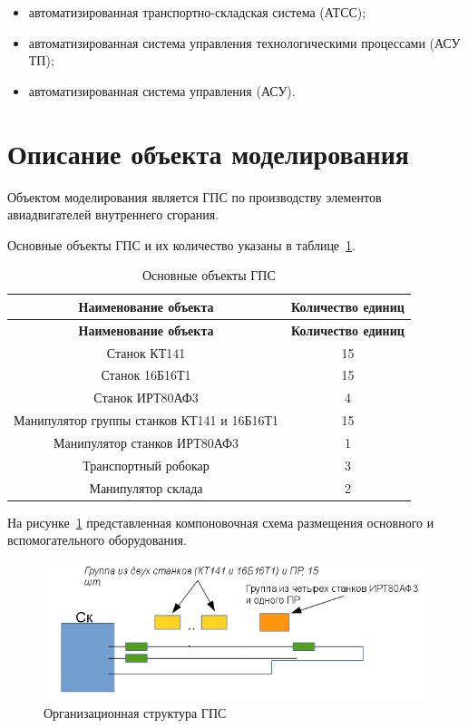 \begin{itemize}
    \item автоматизированная транспортно-складская система (АТСС);
    \item автоматизированная система управления технологическими процессами (АСУ ТП);
    \item автоматизированная система управления (АСУ).
\end{itemize}

\section{Описание объекта моделирования}

Объектом моделирования является ГПС по производству элементов авиадвигателей внутреннего сгорания. 

Основные объекты ГПС и их количество указаны в таблице~\ref{tab:objects}.

\begin{longtable}[c]{|c|c|}
    \caption{Основные объекты ГПС}
    \label{tab:objects}\\
    \hline
    \textbf{Наименование объекта} & \textbf{Количество единиц}\\
    \hline
    \endfirsthead
    \hline
    \textbf{Наименование объекта} & \textbf{Количество единиц}\\
    \hline
    \endhead
        Станок КТ141 & 15\\
        \hline
        Станок 16Б16Т1 & 15\\
        \hline
        Станок ИРТ80АФ3 & 4\\
        \hline
        Манипулятор группы станков КТ141 и 16Б16Т1 & 15\\
        \hline
        Манипулятор станков ИРТ80АФ3 & 1\\
        \hline
        Транспортный робокар & 3\\
        \hline
        Манипулятор склада & 2\\
        \hline
\end{longtable}

На рисунке~\ref{fig:componovka} представленная компоновочная схема размещения основного и вспомогательного оборудования.

\begin{figure}[ht]
    \includegraphics[width=1\linewidth]{Figures/componovka.png}
    \caption{Организационная структура ГПС}
    \label{fig:componovka}
\end{figure}

